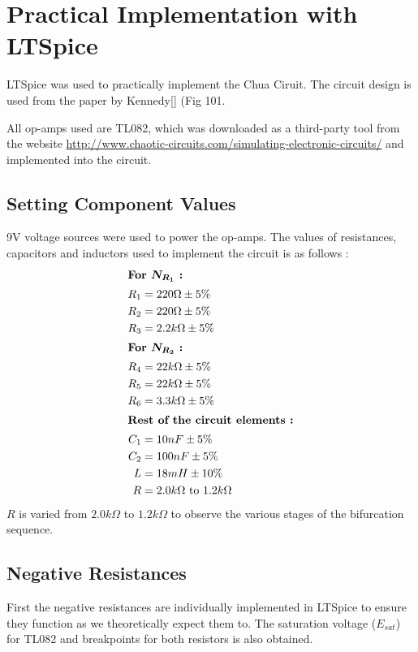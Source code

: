 \documentclass[12pt]{article}
\begin{document}
\section{Practical Implementation with LTSpice}
LTSpice was used to practically implement the Chua Ciruit. The circuit design is used from the paper by Kennedy[{\color{red}{put ref}}] (Fig 101. \linebreak

All op-amps used are TL082, which was downloaded as a third-party tool from the website \url{http://www.chaotic-circuits.com/simulating-electronic-circuits/} and implemented into the circuit.\linebreak
\subsection{Setting Component Values}
9V voltage sources were used to power the op-amps. The values of resistances, capacitors and inductors used to implement the circuit is as follows :
\begin{align*}
	\intertext{\textbf{For $\bm{N_{R_1}}$ :}}
	R_1 &= 220\Omega \pm 5\% \\
	R_2 &= 220\Omega \pm 5\% \\
	R_3 &= 2.2k\Omega \pm 5\% \\
	\intertext{\textbf{For $\bm{N_{R_2}}$ :}}
	R_4 &= 22k\Omega \pm 5\% \\
	R_5 &= 22k\Omega \pm 5\% \\
	R_6 &= 3.3k\Omega \pm 5\% \\ 
	\intertext{\textbf{Rest of the circuit elements :}}
	C_1 &= 10nF \pm 5\% \\
	C_2 &= 100nF \pm 5\% \\
	L &= 18mH \pm 10\% \\
	R &= 2.0k\Omega \text{ to } 1.2k\Omega 
\end{align*}
$R$ is varied from $2.0k\Omega$ to $1.2k\Omega$ to observe the various stages of the bifurcation sequence. 
\subsection{Negative Resistances}
First the negative resistances are individually implemented in LTSpice to ensure they function as we theoretically expect them to. The saturation voltage ($E_{sat}$) for TL082 and breakpoints for both resistors is also obtained. \linebreak
\end{document}
